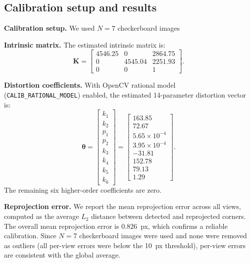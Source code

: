 \documentclass{article}
\begin{document}
\subsection{Calibration setup and results}
\textbf{Calibration setup.} We used $N=7$ checkerboard images

\textbf{Intrinsic matrix.} The estimated intrinsic matrix is:
\begin{equation}
\mathbf{K}=
\begin{bmatrix}
4546.25 & 0 & 2864.75 \\
0 & 4545.04 & 2251.93 \\
0 & 0 & 1
\end{bmatrix}.
\label{eq:K_num}
\end{equation}

\textbf{Distortion coefficients.} With OpenCV rational model (\texttt{CALIB\_RATIONAL\_MODEL}) enabled, the estimated 14-parameter distortion vector is:
\begin{equation}
\boldsymbol{\theta} =
\begin{bmatrix}
k_1 \\ k_2 \\ p_1 \\ p_2 \\ k_3 \\ k_4 \\ k_5 \\ k_6
\end{bmatrix}
=
\begin{bmatrix}
163.85 \\ 72.67 \\ 5.65\times10^{-4} \\ 3.95\times10^{-4} \\ -31.81 \\ 152.78 \\ 79.13 \\ 1.29
\end{bmatrix}.
\label{eq:dist_num}
\end{equation}
The remaining six higher-order coefficients are zero.

\textbf{Reprojection error.}
We report the mean reprojection error across all views, computed as the average $L_2$ distance between detected and reprojected corners.
The overall mean reprojection error is $\mathbf{0.826}$~px, which confirms a reliable calibration.
Since $N=7$ checkerboard images were used and none were removed as outliers (all per-view errors were below the 10~px threshold), per-view errors are consistent with the global average.
\end{document}

